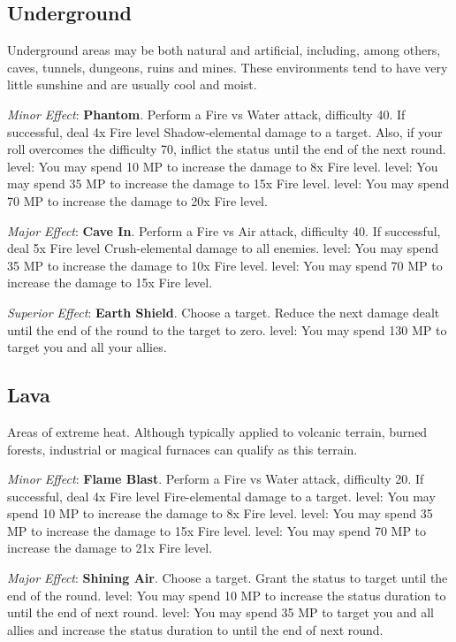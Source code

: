 \begin{multicols}{2}
\subsection*{Underground}\label{subsec:geo-underground}
Underground areas may be both natural and artificial, including, among others, caves, tunnels, dungeons, ruins and mines. These environments tend to have very little sunshine and are usually cool and moist.

\textit{Minor Effect}: \textbf{Phantom}. Perform a Fire vs Water attack, difficulty 40. If successful, deal 4x Fire level Shadow-elemental damage to a target. Also, if your roll overcomes the difficulty 70, inflict the  status until the end of the next round.  level: You may spend 10 MP to increase the damage to 8x Fire level.  level: You may spend 35 MP to increase the damage to 15x Fire level.  level: You may spend 70 MP to increase the damage to 20x Fire level.

\textit{Major Effect}: \textbf{Cave In}. Perform a Fire vs Air attack, difficulty 40. If successful, deal 5x Fire level Crush-elemental damage to all enemies.  level: You may spend 35 MP to increase the damage to 10x Fire level.  level: You may spend 70 MP to increase the damage to 15x Fire level.

\textit{Superior Effect}: \textbf{Earth Shield}. Choose a target. Reduce the next damage dealt until the end of the round to the target to zero.  level: You may spend 130 MP to target you and all your allies.

\subsection*{Lava}\label{subsec:geo-lava}
Areas of extreme heat. Although typically applied to volcanic terrain, burned forests, industrial or magical furnaces can qualify as this terrain.

\textit{Minor Effect}: \textbf{Flame Blast}. Perform a Fire vs Water attack, difficulty 20. If successful, deal 4x Fire level Fire-elemental damage to a target.  level: You may spend 10 MP to increase the damage to 8x Fire level.  level: You may spend 35 MP to increase the damage to 15x Fire level.  level: You may spend 70 MP to increase the damage to 21x Fire level.

\textit{Major Effect}: \textbf{Shining Air}. Choose a target. Grant the  status to target until the end of the round.  level: You may spend 10 MP to increase the status duration to until the end of next round. level: You may spend 35 MP to target you and all allies and increase the status duration to until the end of next round.


\end{multicols}
